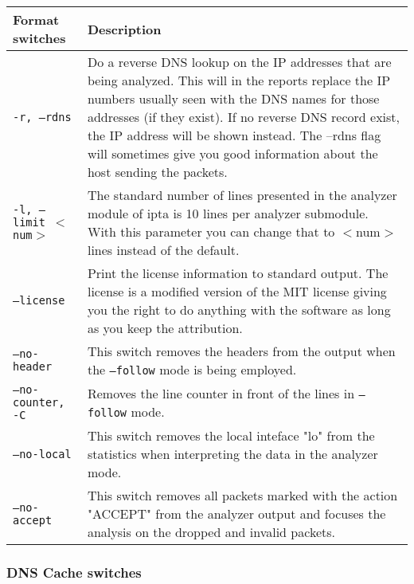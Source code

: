 \documentclass[english,twoside,openright,a4paper,12pt]{article}
\begin{document}
\scriptsize
\begin{longtable}{|p{}|p{}|}
\hline
\textbf{Format switches} & \textbf{Description}\\ \hline

\texttt{-r, --rdns} & 

Do a reverse DNS lookup on the IP addresses that are being analyzed.
This will in the reports replace the IP numbers usually seen with the
DNS names for those addresses (if they exist). If no reverse DNS
record exist, the IP address will be shown instead. The --rdns flag
will sometimes give you good information about the host sending the
packets.\\\hline

\texttt{-l, --limit $<$num$>$} & 

The standard number of lines presented in the analyzer module of ipta
is 10 lines per analyzer submodule. With this parameter you can change
that to $<$num$>$ lines instead of the default.\\\hline

\texttt{--license} & 

Print the license information to standard output. The license is a
modified version of the MIT license giving you the right to do
anything with the software as long as you keep the
attribution.\\ \hline

\texttt{--no-header} & 

This switch removes the headers from the output when the
\texttt{--follow} mode is being employed.\\\hline

\texttt{--no-counter, -C} & 

Removes the line counter in front of the lines in \texttt{--follow}
mode.\\\hline

\texttt{--no-local} & 

This switch removes the local inteface "lo" from the statistics when
interpreting the data in the analyzer mode.\\\hline

\texttt{--no-accept} & 

This switch removes all packets marked with the action "ACCEPT" from
the analyzer output and focuses the analysis on the dropped and
invalid packets.\\\hline
\end{longtable}

\subsubsection{DNS Cache switches}
\end{document}
